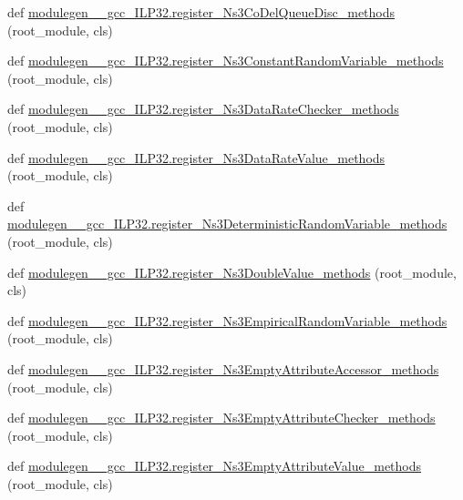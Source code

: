 \begin{DoxyCompactItemize}
\item 
def \hyperlink{namespacemodulegen____gcc__ILP32_a1a4a717b33d1bcd65e13b6c4c21c2179}{modulegen\+\_\+\+\_\+gcc\+\_\+\+I\+L\+P32.\+register\+\_\+\+Ns3\+Co\+Del\+Queue\+Disc\+\_\+methods} (root\+\_\+module, cls)
\item 
def \hyperlink{namespacemodulegen____gcc__ILP32_a42c81b9cd2cbe5e8e49f81b203911b61}{modulegen\+\_\+\+\_\+gcc\+\_\+\+I\+L\+P32.\+register\+\_\+\+Ns3\+Constant\+Random\+Variable\+\_\+methods} (root\+\_\+module, cls)
\item 
def \hyperlink{namespacemodulegen____gcc__ILP32_a29fce5b90bb63029c10e1f6c31445ef8}{modulegen\+\_\+\+\_\+gcc\+\_\+\+I\+L\+P32.\+register\+\_\+\+Ns3\+Data\+Rate\+Checker\+\_\+methods} (root\+\_\+module, cls)
\item 
def \hyperlink{namespacemodulegen____gcc__ILP32_ae9a5e4f1c8744f24232f30ba6195316c}{modulegen\+\_\+\+\_\+gcc\+\_\+\+I\+L\+P32.\+register\+\_\+\+Ns3\+Data\+Rate\+Value\+\_\+methods} (root\+\_\+module, cls)
\item 
def \hyperlink{namespacemodulegen____gcc__ILP32_a863c4172668c4be59165816ab68bf4ea}{modulegen\+\_\+\+\_\+gcc\+\_\+\+I\+L\+P32.\+register\+\_\+\+Ns3\+Deterministic\+Random\+Variable\+\_\+methods} (root\+\_\+module, cls)
\item 
def \hyperlink{namespacemodulegen____gcc__ILP32_a655ce0a1b19f17b677a9ccff35c632fd}{modulegen\+\_\+\+\_\+gcc\+\_\+\+I\+L\+P32.\+register\+\_\+\+Ns3\+Double\+Value\+\_\+methods} (root\+\_\+module, cls)
\item 
def \hyperlink{namespacemodulegen____gcc__ILP32_a6446c81f0f288423f8095c58812c96a6}{modulegen\+\_\+\+\_\+gcc\+\_\+\+I\+L\+P32.\+register\+\_\+\+Ns3\+Empirical\+Random\+Variable\+\_\+methods} (root\+\_\+module, cls)
\item 
def \hyperlink{namespacemodulegen____gcc__ILP32_a489a942ef59028089c93b9dea61069a3}{modulegen\+\_\+\+\_\+gcc\+\_\+\+I\+L\+P32.\+register\+\_\+\+Ns3\+Empty\+Attribute\+Accessor\+\_\+methods} (root\+\_\+module, cls)
\item 
def \hyperlink{namespacemodulegen____gcc__ILP32_a46ed8d8e239b38c1a4353a533fcb77a2}{modulegen\+\_\+\+\_\+gcc\+\_\+\+I\+L\+P32.\+register\+\_\+\+Ns3\+Empty\+Attribute\+Checker\+\_\+methods} (root\+\_\+module, cls)
\item 
def \hyperlink{namespacemodulegen____gcc__ILP32_a4f1a7f7e506590df165bd2f16ec88878}{modulegen\+\_\+\+\_\+gcc\+\_\+\+I\+L\+P32.\+register\+\_\+\+Ns3\+Empty\+Attribute\+Value\+\_\+methods} (root\+\_\+module, cls)
\item 

\end{DoxyCompactItemize}
